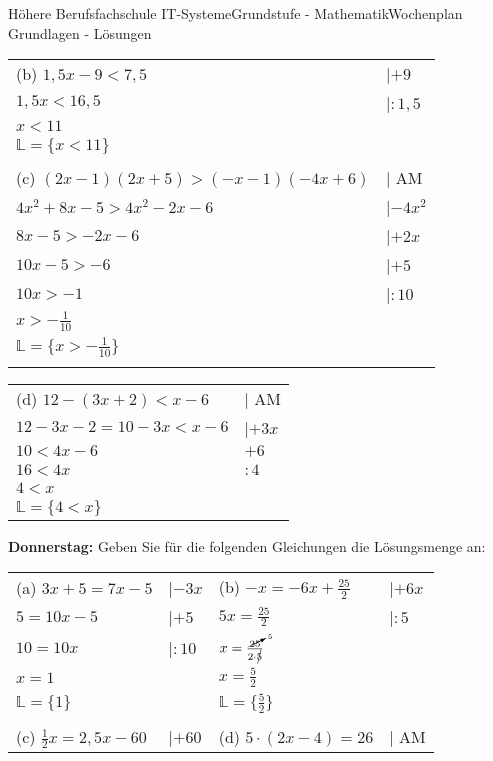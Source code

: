 \documentclass[oneside,openany,headings=optiontotoc,11pt,numbers=noenddot]{scrreprt}
\begin{document}
\begin{worksheet}{Höhere Berufsfachschule IT-Systeme}{Grundstufe - Mathematik}{Wochenplan Grundlagen - Lösungen}
\begin{framed}
\begin{tabularx}{\textwidth}{ll}
				\\
				(b) \(1,5x-9 < 7,5\) & |\(+9\)\\
				\(1,5x < 16,5\) & |\(:1,5\)\\
				\(x < 11\)\\
				\(\mathbb{L} = \{x<11\}\)\\
				\\
				(c) \((2x-1)(2x+5) > (-x-1)(-4x+6)\) & | AM\\
				\(4x^2 + 8x -5 > 4x^2 -2x -6\) & |\(-4x^2\)\\
				\(8x -5 > -2x-6\) & |\(+2x\)\\
				\(10x -5 > -6\) & |\(+5\)\\
				\(10x > -1\) & |\(:10\)\\
				\(x > -\frac{1}{10}\)\\
				\(\mathbb{L} = \{x > -\frac{1}{10}\}\)\\
				\\
			\end{tabularx}
			\begin{tabularx}{\textwidth}{ll}
				(d) \(12-(3x+2) < x-6\) & | AM\\
				\(12 -3x -2 = 10 -3x < x-6\) & |\(+3x\)\\
				\(10 < 4x -6\) & \(+6\)\\
				\(16 < 4x\) & \(:4\)\\
				\(4 < x\)\\
				\(\mathbb{L} = \{4 < x\}\)\\
			\end{tabularx}
		\end{framed}
		\begin{framed}
			\noindent
			\textbf{Donnerstag:} Geben Sie für die folgenden Gleichungen die Lösungsmenge an:\\
			\begin{tabularx}{\textwidth}{Xl|Xl}
				(a) \(3x+5 = 7x - 5\) & |\(-3x\) & (b) \(-x = -6x + \frac{25}{2}\) & |\(+6x\)\\
				\(5 = 10x -5\) & |\(+5\) & \(5x = \frac{25}{2}\) & |\(:5\)\\
				\(10 = 10x\) & |\(:10\) & \(x = \frac{\cancelto{5}{25}}{2\cdot\cancel{5}}\)\\
				\(x = 1\) & & \(x = \frac{5}{2}\) & \\
				\(\mathbb{L} = \{1\}\) & & \(\mathbb{L} = \{\frac{5}{2}\}\)\\
				\hline
				\hline
				\\
				(c) \(\frac{1}{2}x = 2,5x-60\) & |\(+60\) & (d) \(5\cdot(2x-4) = 26\) & | AM\\

\end{tabularx}
\end{framed}
\end{worksheet}
\end{document}
